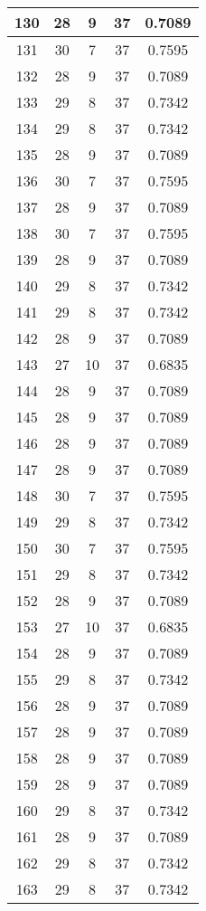 \documentclass[letterpaper, 12pt]{article}
\begin{document}
\begin{longtable}{|c|c|c|c|c|}
\hline
130 & 28 & 9 & 37 & 0.7089 \\
\hline
131 & 30 & 7 & 37 & 0.7595 \\
\hline
132 & 28 & 9 & 37 & 0.7089 \\
\hline
133 & 29 & 8 & 37 & 0.7342 \\
\hline
134 & 29 & 8 & 37 & 0.7342 \\
\hline
135 & 28 & 9 & 37 & 0.7089 \\
\hline
136 & 30 & 7 & 37 & 0.7595 \\
\hline
137 & 28 & 9 & 37 & 0.7089 \\
\hline
138 & 30 & 7 & 37 & 0.7595 \\
\hline
139 & 28 & 9 & 37 & 0.7089 \\
\hline
140 & 29 & 8 & 37 & 0.7342 \\
\hline
141 & 29 & 8 & 37 & 0.7342 \\
\hline
142 & 28 & 9 & 37 & 0.7089 \\
\hline
143 & 27 & 10 & 37 & 0.6835 \\
\hline
144 & 28 & 9 & 37 & 0.7089 \\
\hline
145 & 28 & 9 & 37 & 0.7089 \\
\hline
146 & 28 & 9 & 37 & 0.7089 \\
\hline
147 & 28 & 9 & 37 & 0.7089 \\
\hline
148 & 30 & 7 & 37 & 0.7595 \\
\hline
149 & 29 & 8 & 37 & 0.7342 \\
\hline
150 & 30 & 7 & 37 & 0.7595 \\
\hline
151 & 29 & 8 & 37 & 0.7342 \\
\hline
152 & 28 & 9 & 37 & 0.7089 \\
\hline
153 & 27 & 10 & 37 & 0.6835 \\
\hline
154 & 28 & 9 & 37 & 0.7089 \\
\hline
155 & 29 & 8 & 37 & 0.7342 \\
\hline
156 & 28 & 9 & 37 & 0.7089 \\
\hline
157 & 28 & 9 & 37 & 0.7089 \\
\hline
158 & 28 & 9 & 37 & 0.7089 \\
\hline
159 & 28 & 9 & 37 & 0.7089 \\
\hline
160 & 29 & 8 & 37 & 0.7342 \\
\hline
161 & 28 & 9 & 37 & 0.7089 \\
\hline
162 & 29 & 8 & 37 & 0.7342 \\
\hline
163 & 29 & 8 & 37 & 0.7342 \\

\end{longtable}
\end{document}
